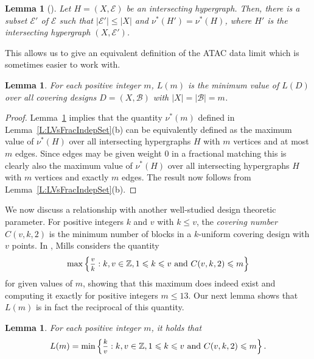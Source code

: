 \documentclass[11pt]{article}
\newtheorem{Lemma}[Theorem]{Lemma}
\theoremstyle{definition}
\renewcommand{\leq}{\leqslant}
\newcommand{\B}{{\ensuremath{\mathcal{B}}}}
\newcommand{\E}{\mathcal{E}}
\begin{document}
\begin{Lemma}[\cite{Fur}]\label{L:symCover}
Let $H=(X,\mathcal{E})$ be an intersecting hypergraph. Then, there is a subset $\E'$ of $\E$ such that $|\E'| \leq |X|$ and $\nu^*(H')=\nu^*(H)$, where $H'$ is the intersecting hypergraph $(X,\E')$.
\end{Lemma}

This allows us to give an equivalent definition of the ATAC data limit which is sometimes easier to work with.

\begin{Lemma}\label{L:equiDef}
For each positive integer $m$, $L(m)$ is the minimum value of $L(D)$ over all covering designs $D=(X,\B)$ with $|X|=|\B|=m$.
\end{Lemma}

\begin{proof}
Lemma~\ref{L:symCover} implies that the quantity $\nu^*(m)$ defined in Lemma~\ref{L:LVsFracIndepSet}(b) can be equivalently defined as the maximum value of $\nu^*(H)$ over all intersecting hypergraphs $H$ with $m$ vertices and at most $m$ edges. Since edges may be given weight 0 in a fractional matching this is clearly also the maximum value of $\nu^*(H)$ over all intersecting hypergraphs $H$ with $m$ vertices and exactly $m$ edges. The result now follows from Lemma~\ref{L:LVsFracIndepSet}(b).
\end{proof}

We now discuss a relationship with another well-studied design theoretic parameter.
For positive integers $k$ and $v$ with $k \leq v$, the \emph{covering number $C(v,k,2)$} is the minimum number of blocks in a $k$-uniform covering design with $v$ points. In \cite{Mil}, Mills considers the quantity
\[\max\left\{\mfrac{v}{k}:k,v \in \mathbb{Z}, 1 \leq k \leq v \text{ and } C(v,k,2) \leq m\right\}\]
for given values of $m$, showing that this maximum does indeed exist and computing it exactly for positive integers $m \leq 13$. Our next lemma shows that $L(m)$ is in fact the reciprocal of this quantity.


\begin{Lemma}\label{L:LVsCovNumber}
For each positive integer $m$, it holds that
\begin{equation}\label{E:LVsCovNumber}
L(m) = \min\left\{\mfrac{k}{v}:k,v \in \mathbb{Z}, 1 \leq k \leq v \text{ and } C(v,k,2) \leq m\right\}.
\end{equation}
\end{Lemma}
\end{document}
